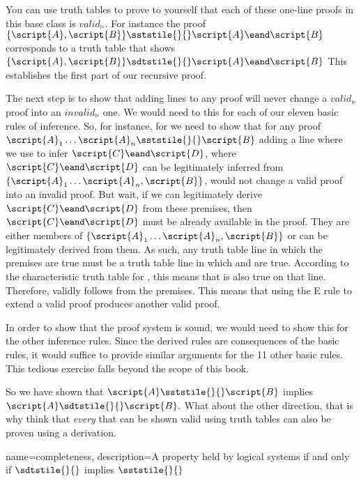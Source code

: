 You can use truth tables to prove to yourself that each of these one-line proofs in this base class is $valid_{\models}$. For instance the proof $\{\script{A}, \script{B}\} \sststile{}{} \script{A} \eand \script{B}$ corresponds to a truth table that shows $\{\script{A}, \script{B}\} \sdtstile{}{} \script{A} \eand \script{B}$ This establishes the first part of our recursive proof. 

The next step is to show that adding lines to any proof will never change a $valid_{\models}$ proof into an $invalid_{\models}$ one. We would need to this for each of our eleven basic rules of inference. So, for instance, for  we need to show that for any proof $\script{A}_{1} \ldots{} \script{A}_{n} \sststile{}{} \script {B}$ adding a line where we use  to infer $\script{C} \eand \script{D}$, where $\script{C} \eand \script{D}$ can be legitimately inferred from $\{\script{A}_{1} \ldots{} \script{A}_{n}, \script {B}\}$, would not change a valid proof into an invalid proof. But wait, if we can legitimately derive $\script{C} \eand \script{D}$ from these premises, then $\script{C} \eand \script{D}$ must be already available in the proof. They are either members of  $\{\script{A}_{1} \ldots{} \script{A}_{n}, \script {B}\}$ or can be legitimately derived from them. As such, any truth table line in which the premises are true must be a truth table line in which  and  are true. According to the characteristic truth table for \eand, this means that \eand{} is also true on that line. Therefore, \eand{} validly follows from the premises. This means that using the {\eand}E rule to extend a valid proof produces another valid proof.

In order to show that the proof system is sound, we would need to show this for the other inference rules. Since the derived rules are consequences of the basic rules, it would suffice to provide similar arguments for the 11 other basic rules. This tedious exercise falls beyond the scope of this book.

So we have shown that $\script{A} \sststile{}{} \script{B}$ implies $\script{A} \sdtstile{}{}\script{B}.$ What about the other direction, that is why think that \emph{every} that can be shown valid using truth tables can also be proven using a derivation. 

{
name=completeness,
description={A property held by logical systems if and only if $\sdtstile{}{}$ implies $\sststile{}{}$}
}


